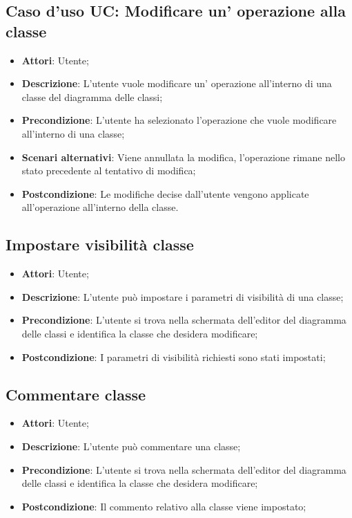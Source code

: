 \documentclass[../AnalisiDeiRequisiti.tex]{subfiles}
\begin{document}
			\subsection{Caso d'uso UC: Modificare un' operazione alla classe}
			\begin{itemize}
				\item \textbf{Attori}: Utente;
				
				\item \textbf{Descrizione}: L'utente vuole modificare un' operazione all'interno di una classe del diagramma delle classi;
				
				\item \textbf{Precondizione}: L'utente ha selezionato l'operazione che vuole modificare all'interno di una classe;
				
				\item \textbf{Scenari alternativi}: Viene annullata la modifica, l'operazione 
				rimane nello stato precedente al tentativo di modifica;
				
				\item \textbf{Postcondizione}: Le modifiche decise dall'utente vengono applicate all'operazione all'interno della classe.
			\end{itemize}
			
			
			\subsection{Impostare visibilità classe}
			\begin{itemize}
				\item \textbf{Attori}: Utente;
				\item \textbf{Descrizione}: L'utente può impostare i parametri di visibilità di una classe;
				\item \textbf{Precondizione}: L’utente si trova nella schermata dell’editor del diagramma delle classi e identifica la classe che desidera modificare;
				\item \textbf{Postcondizione}: I parametri di visibilità richiesti sono stati impostati;
			\end{itemize}
			
			\subsection{Commentare classe}
			\begin{itemize}
				\item \textbf{Attori}: Utente;
				\item \textbf{Descrizione}: L'utente può commentare una classe;
				\item \textbf{Precondizione}: L’utente si trova nella schermata dell’editor del diagramma delle classi e identifica la classe che desidera modificare;
				\item \textbf{Postcondizione}: Il commento relativo alla classe viene impostato;
			\end{itemize}
			
\end{document}
